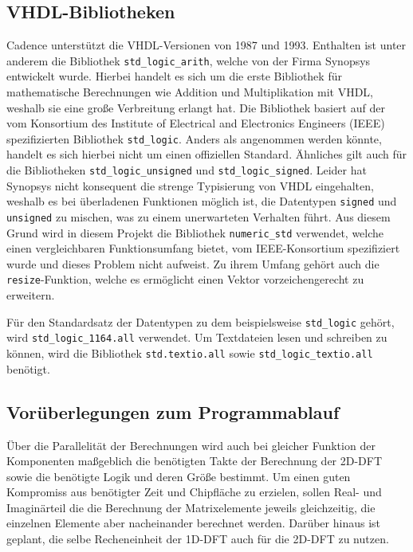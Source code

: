  
 
 \subsection{VHDL-Bibliotheken}
 Cadence unterstützt die VHDL-Versionen von 1987 und 1993. 
 Enthalten ist unter anderem die Bibliothek \texttt{std\_logic\_arith}, welche von der Firma Synopsys entwickelt wurde. Hierbei handelt es sich um die erste Bibliothek
 für mathematische Berechnungen wie Addition und Multiplikation mit VHDL, weshalb sie eine große Verbreitung erlangt hat.
 Die Bibliothek basiert auf der vom Konsortium des Institute of Electrical and Electronics Engineers (IEEE) spezifizierten Bibliothek \texttt{std\_logic}. Anders als angenommen werden könnte, handelt es sich hierbei nicht um einen offiziellen Standard.
 Ähnliches gilt auch für die Bibliotheken \texttt{std\_logic\_unsigned} und \texttt{std\_logic\_signed}.
 Leider hat Synopsys nicht konsequent die strenge Typisierung von VHDL eingehalten, weshalb es bei überladenen Funktionen möglich ist, die Datentypen \texttt{signed} und \texttt{unsigned} zu mischen, was zu einem unerwarteten Verhalten führt.
 Aus diesem Grund wird in diesem Projekt die Bibliothek \texttt{numeric\_std} verwendet, welche einen vergleichbaren Funktionsumfang bietet, vom IEEE-Konsortium spezifiziert wurde und dieses Problem nicht aufweist. Zu ihrem 
 Umfang gehört auch die \texttt{resize}-Funktion, welche es ermöglicht einen Vektor vorzeichengerecht zu erweitern.
 
Für den Standardsatz der Datentypen zu dem beispielsweise \texttt{std\_logic} gehört, wird 
\texttt{std\_logic\_1164.all} verwendet.
Um Textdateien lesen und schreiben zu können, wird die Bibliothek \texttt{std.textio.all} sowie 
\texttt{std\_logic\_textio.all} benötigt.

 
\subsection{Vorüberlegungen zum Programmablauf}\label{sec:VorueberlegungenProgrammablauf}
Über die Parallelität der Berechnungen wird auch bei gleicher Funktion der Komponenten maßgeblich die benötigten Takte der Berechnung der 2D-DFT sowie die benötigte
Logik und deren Größe bestimmt. 
Um einen guten Kompromiss aus benötigter Zeit und Chipfläche zu erzielen,
sollen  Real- und Imaginärteil die die Berechnung der Matrixelemente jeweils gleichzeitig, die einzelnen Elemente aber nacheinander berechnet werden. Darüber hinaus ist geplant, die selbe Recheneinheit der 1D-DFT auch für die 2D-DFT zu nutzen. 


